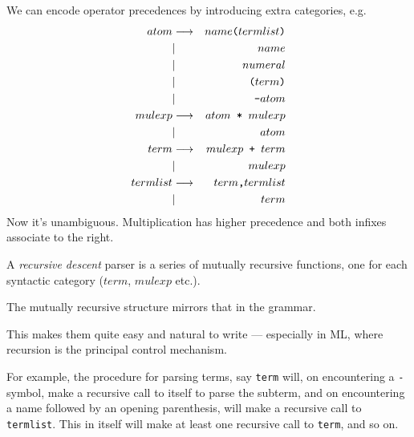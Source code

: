 \begin{slide*}


\vspace*{0.5cm}

We can encode operator precedences by introducing extra categories, e.g.
{\red
\begin{eqnarray*}
atom     & \goesto & name{\verb!(!} termlist {\verb!)!}         \\
         & |       & name                                       \\
         & |       & numeral                                    \\
         & |       & {\verb!(!} term {\verb!)!}                 \\
         & |       & {\verb!-!} atom                            \\
mulexp   & \goesto & atom {\verb! * !} mulexp                   \\
         & |       & atom                                       \\
term     & \goesto & mulexp {\verb! + !} term                   \\
         & |       & mulexp                                     \\
termlist & \goesto & term {\verb!,!} termlist                   \\
         & |       & term
\end{eqnarray*}}
Now it's unambiguous. Multiplication has higher precedence and both infixes
associate to the right.

\end{slide*}




\begin{slide*}


\vspace*{0.5cm}

A {\em recursive descent} parser is a series of mutually recursive functions,
one for each syntactic category ($term$, $mulexp$ etc.).

The mutually recursive structure mirrors that in the grammar.

This makes them quite easy and natural to write --- especially in ML, where
recursion is the principal control mechanism.

For example, the procedure for parsing terms, say {\black \verb!term!} will, on
encountering a {\black \verb!-!} symbol, make a recursive call to itself to
parse the subterm, and on encountering a name followed by an opening
parenthesis, will make a recursive call to {\black \verb!termlist!}. This in
itself will make at least one recursive call to {\black \verb!term!}, and so
on.

\end{slide*}



